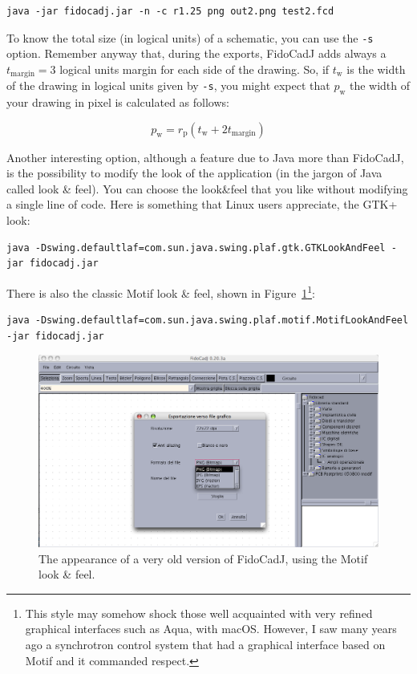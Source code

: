 \documentclass[10pt,a4paper,twoside]{scrreprt}
\begin{document}
\begin{lstlisting}
java -jar fidocadj.jar -n -c r1.25 png out2.png test2.fcd
\end{lstlisting}

To know the total size (in logical units) of a schematic, you can use the \lstinline!-s! option. Remember anyway that, during the exports, FidoCadJ adds always a $t_\mathrm{margin}=3$ logical units margin for each side of the drawing. So, if $t_\mathrm{w}$ is the width of the drawing in logical units given by \lstinline!-s!, you might expect that $p_\mathrm{w}$ the width of your drawing in pixel is calculated as follows:

\begin{equation}
p_\mathrm{w} = r_\mathrm{p} (t_\mathrm{w}+ 2 t_\mathrm{margin})
\end{equation}

Another interesting option, although a feature due to Java
more than FidoCadJ, is the possibility to modify the look of the application
(in the jargon of Java called look \& feel).
You can choose the look\&feel that you like without modifying a single
line of code. Here is something that Linux users appreciate,
the GTK+ look:
\begin{lstlisting}
java -Dswing.defaultlaf=com.sun.java.swing.plaf.gtk.GTKLookAndFeel -jar fidocadj.jar
\end{lstlisting}
There is also the classic Motif
look \& feel, shown in Figure~\ref{fig_fidocadj_motif}\footnote{This style may somehow shock those well acquainted with very refined graphical interfaces such as Aqua, with macOS. However, I saw many years ago a synchrotron control system that had a graphical interface based on Motif and it commanded respect.}:
\begin{lstlisting}
java -Dswing.defaultlaf=com.sun.java.swing.plaf.motif.MotifLookAndFeel -jar fidocadj.jar
\end{lstlisting} %
\begin{figure}
\includegraphics[width=1\textwidth]{fidocadj_motif}

\caption{The appearance of a very old version of FidoCadJ, using the Motif look \& feel.}

\label{fig_fidocadj_motif}
\end{figure}
\end{document}
